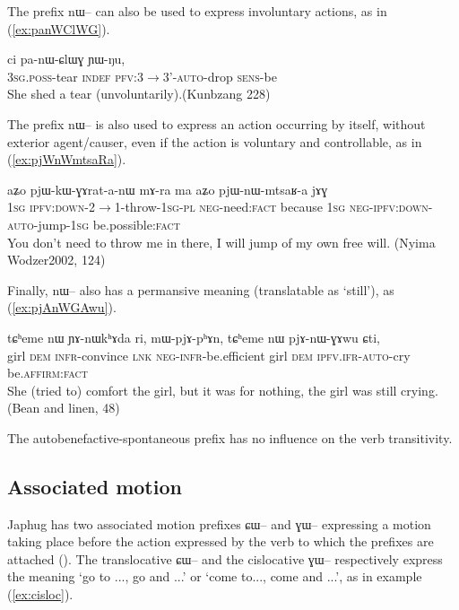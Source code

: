 \documentclass[oldfontcommands,oneside,a4paper,11pt]{article}
\newcommand{\ipa}[1]{{\phon#1}} %
\newcommand{\refb}[1]{(\ref{#1})}
\newcommand{\factual}[1]{\textsc{:fact}}
\begin{document}
The prefix \ipa{nɯ--} can also be used to express involuntary actions, as in \refb{ex:panWClWG}.

\begin{exe}
\ex \label{ex:panWClWG}
\gll \ipa{ɯ-qom} 	\ipa{ci} 	\ipa{pa-nɯ-ɕlɯɣ} 	\ipa{ɲɯ-ŋu,} \\
\textsc{3sg.poss}-tear \textsc{indef} \textsc{pfv:3$\rightarrow$3'-auto}-drop \textsc{sens}-be \\
\glt She shed a tear (unvoluntarily).(Kunbzang 228)
\end{exe}


The prefix \ipa{nɯ--} is also used to express an action occurring by itself, without exterior agent/causer, even if the action is voluntary and controllable, as in \refb{ex:pjWnWmtsaRa}.

\begin{exe}
\ex \label{ex:pjWnWmtsaRa}
\gll 
\ipa{aʑo} 	\ipa{pjɯ-kɯ-ɣɤrat-a-nɯ} 	\ipa{mɤ-ra} 	\ipa{ma} 	\ipa{aʑo} 	\ipa{pjɯ-nɯ-mtsaʁ-a} 	\ipa{jɤɣ} \\
\textsc{1sg} \textsc{ipfv:down}-2$\rightarrow$1-throw-\textsc{1sg-pl} \textsc{neg-}need\factual{} because \textsc{1sg} \textsc{neg-ipfv:down-auto}-jump-\textsc{1sg} be.possible\factual{} \\
\glt You don't need to throw me in there, I will jump of my own free will. (Nyima Wodzer2002, 124)
\end{exe}

Finally, \ipa{nɯ--} also has a permansive meaning (translatable as `still'), as \refb{ex:pjAnWGAwu}.


\begin{exe}
\ex \label{ex:pjAnWGAwu}
\gll
\ipa{tɕʰeme} 	\ipa{nɯ} 	\ipa{ɲɤ-nɯkʰɤda} 	\ipa{ri,} 	\ipa{mɯ-pjɤ-pʰɤn,} 	\ipa{tɕʰeme} 	\ipa{nɯ} 	\ipa{pjɤ-nɯ-ɣɤwu} 	\ipa{ɕti,} \\
girl \textsc{dem} \textsc{infr}-convince \textsc{lnk} \textsc{neg-infr}-be.efficient girl \textsc{dem} \textsc{ipfv.ifr-auto}-cry  be.\textsc{affirm:fact} \\
\glt She (tried to) comfort the girl, but it was for nothing, the girl was still crying. (Bean and linen, 48)
\end{exe} 

The autobenefactive-spontaneous prefix has no influence on the verb transitivity.

\subsection{Associated motion}
Japhug has two associated motion prefixes \ipa{ɕɯ--} and \ipa{ɣɯ--} expressing a motion taking place before the action expressed by the verb to which the prefixes are attached 
(\citealt{jacques13harmonization}). The translocative \ipa{ɕɯ--} and the cislocative \ipa{ɣɯ--} respectively express the meaning `go to ..., go and ...' or `come to..., come and ...', as in example \refb{ex:cisloc}.
\end{document}
